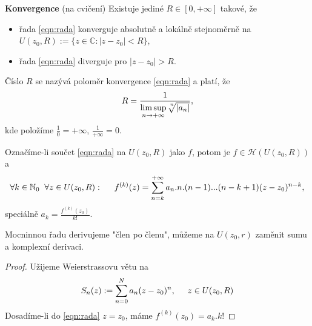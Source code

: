 \begin{properties}
 \textbf{Konvergence} (na cvičení) \newline
Existuje jediné $R\in{[0,+\infty]}$ takové, že 
\begin{itemize}
    \item řada \cref{eqn:rada} konverguje absolutně a lokálně stejnoměrně na  $U(z_0,R):=\{z\in\mathbb{C} : |z-z_0|<R\}$, 
    \item řada \cref{eqn:rada} diverguje pro $|z-z_0|>R$. 
\end{itemize}
Číslo $R$ se nazývá poloměr konvergence \cref{eqn:rada} a platí, že
\[R=\frac{1}{
\underset{n\to+\infty}{\limsup}{\sqrt[\leftroot{-3}\uproot{3}n]{|a_n|}}},\]
kde položíme $\frac{1}{0}=+\infty$, $\frac{1}{+\infty}=0$.

 Označíme-li součet \cref{eqn:rada} na $U(z_0,R)$ jako $f$, potom je $f\in\mathcal{H}(U(z_0,R))$ a 
\[
\forall{k\in\mathbb{N}_0}\hspace{2mm}\forall{z\in{U(z_0,R)}}: \hspace{5mm}
f^{(k)}(z)=
\sum_{n=k}^{+\infty}{a_n.n.(n-1)...(n-k+1)(z-z_0)^{n-k}},\]
speciálně $a_k=\frac{f^{(k)}(z_0)}{k!}$.
\end{properties}

\begin{note}
Mocninnou řadu derivujeme "člen po členu", můžeme na $U(z_0,r)$ zaměnit sumu a komplexní derivaci.
\end{note}

\begin{proof}
Užijeme Weierstrassovu větu na 
\[S_n(z):=\sum_{n=0}^N{a_n(z-z_0)^n},\hspace{5mm} z\in{U(z_0,R)}\]
Dosadíme-li do \cref{eqn:rada} $z=z_0$, máme $f^{(k)}(z_0)={a_k}.{k!}$
\end{proof}